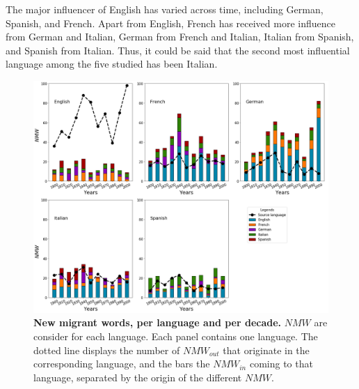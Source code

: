 \documentclass[10pt,letterpaper]{article} %
\begin{document}
The major influencer of English has varied across time, including German, Spanish, and French. Apart from English, French has received more influence from German and Italian, German from French and Italian, Italian from Spanish, and Spanish from Italian. Thus, it could be said that the second most influential language among the five studied has been Italian. 


\begin{figure} %
\begin{adjustwidth}{-1.2in}{0in}
\includegraphics[scale=.35]{NW_A_ejes.png}
\caption{{\bf New migrant words, per language and per decade.} 
$NMW$ are consider for each language. Each panel contains one language. 
The dotted line displays the number of $NMW_{out}$ that originate in the 
corresponding language, and the bars the $NMW_{in}$ coming to that language, 
separated by the origin of the different $NMW$. }
% 
\label{fig.NMW_A}
\end{adjustwidth}
\end{figure} %
	
\end{document}
